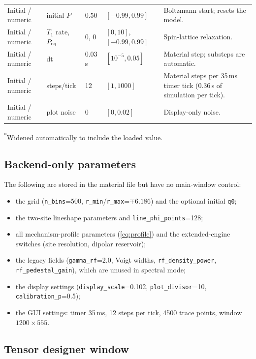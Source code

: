 \documentclass[11pt]{article}
\newcommand{\code}[1]{\texttt{#1}}
\begin{document}
\begin{longtable}{@{}L{0.14\textwidth} L{0.20\textwidth} L{0.11\textwidth} L{0.14\textwidth} L{0.30\textwidth}@{}}
\midrule
Initial / numeric & initial \(P\) & 0.50 & \([-0.99,0.99]\) & Boltzmann start; resets the model.\\
Initial / numeric & \(T_1\) rate, \(P_{\rm eq}\) & 0, 0 & \([0,10]\), \([-0.99,0.99]\) & Spin-lattice relaxation.\\
Initial / numeric & dt & 0.03\,s & \([10^{-5},0.05]\) & Material step; substeps are automatic.\\
Initial / numeric & steps/tick & 12 & \([1,1000]\) & Material steps per 35\,ms timer tick (0.36\,s of simulation per tick).\\
Initial / numeric & plot noise & 0 & \([0,0.02]\) & Display-only noise.\\
\bottomrule
\end{longtable}
\noindent\textsuperscript{*}Widened automatically to include the loaded value.

\subsection{Backend-only parameters}

The following are stored in the material file but have no main-window control:
\begin{itemize}
  \item the grid (\code{n\_bins}=500, \code{r\_min}/\code{r\_max}=\(\mp6.186\)) and the optional initial \code{q0};
  \item the two-site lineshape parameters and \code{line\_phi\_points}=128;
  \item all mechanism-profile parameters (\cref{eq:profile}) and the extended-engine switches (site resolution, dipolar reservoir);
  \item the legacy fields (\code{gamma\_rf}=2.0, Voigt widths, \code{rf\_density\_power}, \code{rf\_pedestal\_gain}), which are unused in spectral mode;
  \item the display settings (\code{display\_scale}=0.102, \code{plot\_divisor}=10, \code{calibration\_p}=0.5);
  \item the GUI settings: timer 35\,ms, 12 steps per tick, 4500 trace points, window \(1200\times555\).
\end{itemize}

\subsection{Tensor designer window}
\end{document}
